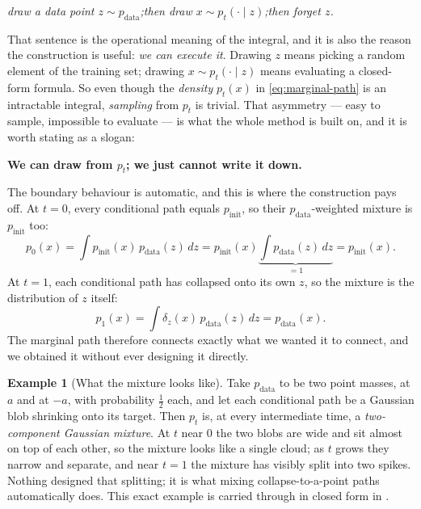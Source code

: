 \documentclass[11pt,a4paper]{report}
\theoremstyle{definition}
\newtheorem{example}[example]{Example}
\theoremstyle{remark}
\begin{document}
\begin{center}
\emph{draw a data point $z\sim p_{\mathrm{data}}$;\quad then draw
$x\sim p_t(\cdot\mid z)$;\quad then forget $z$.}
\end{center}

That sentence is the operational meaning of the integral, and it is also
the reason the construction is useful: \emph{we can execute it}. Drawing
$z$ means picking a random element of the training set; drawing
$x\sim p_t(\cdot\mid z)$ means evaluating a closed-form formula. So even
though the \emph{density} $p_t(x)$ in \eqref{eq:marginal-path} is an
intractable integral, \emph{sampling} from $p_t$ is trivial. That
asymmetry --- easy to sample, impossible to evaluate --- is what the whole
method is built on, and it is worth stating as a slogan:

\begin{center}
\textbf{We can draw from $p_t$; we just cannot write it down.}
\end{center}

The boundary behaviour is automatic, and this is where the construction
pays off. At $t=0$, every conditional path equals $p_{\mathrm{init}}$, so
their $p_{\mathrm{data}}$-weighted mixture is $p_{\mathrm{init}}$ too:
\[
p_0(x) = \int p_{\mathrm{init}}(x)\,p_{\mathrm{data}}(z)\,dz
       = p_{\mathrm{init}}(x)\underbrace{\int p_{\mathrm{data}}(z)\,dz}_{=1}
       = p_{\mathrm{init}}(x) .
\]
At $t=1$, each conditional path has collapsed onto its own $z$, so the
mixture is the distribution of $z$ itself:
\[
p_1(x) = \int \delta_z(x)\,p_{\mathrm{data}}(z)\,dz = p_{\mathrm{data}}(x) .
\]
The marginal path therefore connects exactly what we wanted it to connect,
and we obtained it without ever designing it directly.

\begin{example}[What the mixture looks like]
\label{ex:mixture-picture}
Take $p_{\mathrm{data}}$ to be two point masses, at $a$ and at $-a$, with
probability $\tfrac12$ each, and let each conditional path be a Gaussian
blob shrinking onto its target. Then $p_t$ is, at every intermediate time,
a \emph{two-component Gaussian mixture}. At $t$ near $0$ the two blobs are
wide and sit almost on top of each other, so the mixture looks like a
single cloud; as $t$ grows they narrow and separate, and near $t=1$ the
mixture has visibly split into two spikes. Nothing designed that splitting;
it is what mixing collapse-to-a-point paths automatically does. This exact
example is carried through in closed form in
.
\end{example}
\end{document}

